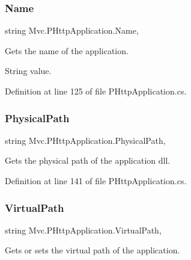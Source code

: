 \subsubsection{\texorpdfstring{Name}{Name}}
{\footnotesize\ttfamily string Mvc.\+P\+Http\+Application.\+Name\hspace{0.3cm}{\ttfamily [get]}, {\ttfamily [set]}}



Gets the name of the application.

String value.

Definition at line 125 of file P\+Http\+Application.\+cs.

\mbox{\label{class_mvc_1_1_p_http_application_acc2f12d716e578beb22a506aaf614491}} 
\subsubsection{\texorpdfstring{Physical\+Path}{PhysicalPath}}
{\footnotesize\ttfamily string Mvc.\+P\+Http\+Application.\+Physical\+Path\hspace{0.3cm}{\ttfamily [get]}, {\ttfamily [set]}}



Gets the physical path of the application dll. 



Definition at line 141 of file P\+Http\+Application.\+cs.

\mbox{\label{class_mvc_1_1_p_http_application_a51d755edd9a7c81e6173730c75eae430}} 
\subsubsection{\texorpdfstring{Virtual\+Path}{VirtualPath}}
{\footnotesize\ttfamily string Mvc.\+P\+Http\+Application.\+Virtual\+Path\hspace{0.3cm}{\ttfamily [get]}, {\ttfamily [set]}}



Gets or sets the virtual path of the application.

